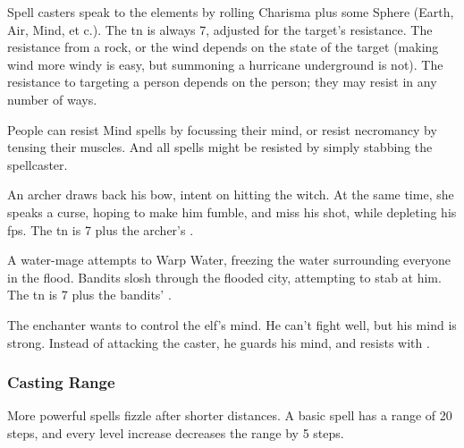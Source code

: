 \begin{multicols}{2}

\noindent
Spell casters speak to the elements by rolling Charisma plus some Sphere (Earth, Air, Mind, et c.).
The \gls{tn} is always 7, adjusted for the target's resistance.
The resistance from a rock, or the wind depends on the state of the target (making wind more windy is easy, but summoning a hurricane underground is not).
The resistance to targeting a person depends on the person; they may resist in any number of ways.

People can resist Mind spells by focussing their mind, or resist necromancy by tensing their muscles.
And all spells might be resisted by simply stabbing the spellcaster.

\vspace{1em}
\begin{exampletext}
  An archer draws back his bow, intent on hitting the witch. At the same time, she speaks a curse, hoping to make him fumble, and miss his shot, while depleting his \glspl{fp}.
  The \gls{tn} is 7 plus the archer's .
\end{exampletext}

\begin{exampletext}
  A water-mage attempts to Warp Water, freezing the water surrounding everyone in the flood. Bandits slosh through the flooded city, attempting to stab at him. The \gls{tn} is 7 plus the bandits' .
\end{exampletext}

\begin{exampletext}
  The enchanter wants to control the elf's mind. He can't fight well, but his mind is strong. Instead of attacking the caster, he guards his mind, and resists with .
\end{exampletext}

\subsubsection{Casting Range}
More powerful spells fizzle after shorter distances.
A basic spell has a range of 20 steps, and every level increase decreases the range by 5 steps.



\end{multicols}

